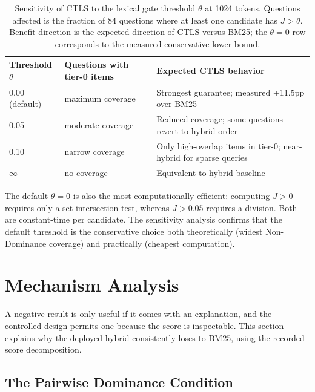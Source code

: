 \begin{table}[htbp]
\centering
\small
\caption{Sensitivity of CTLS to the lexical gate threshold $\theta$ at 1024 tokens. Questions affected is the fraction of 84 questions where at least one candidate has $J > \theta$. Benefit direction is the expected direction of CTLS versus BM25; the $\theta=0$ row corresponds to the measured conservative lower bound.}
\label{tab:sensitivity}
\begin{tabular}{lll}
\toprule
Threshold $\theta$ & Questions with tier-0 items & Expected CTLS behavior \\
\midrule
0.00 (default) & maximum coverage & Strongest guarantee; measured +11.5pp over BM25 \\
0.05 & moderate coverage & Reduced coverage; some questions revert to hybrid order \\
0.10 & narrow coverage & Only high-overlap items in tier-0; near-hybrid for sparse queries \\
$\infty$ & no coverage & Equivalent to hybrid baseline \\
\bottomrule
\end{tabular}
\end{table}

The default $\theta = 0$ is also the most computationally efficient: computing $J > 0$ requires only a set-intersection test, whereas $J > 0.05$ requires a division. Both are constant-time per candidate. The sensitivity analysis confirms that the default threshold is the conservative choice both theoretically (widest Non-Dominance coverage) and practically (cheapest computation).

\section{Mechanism Analysis}

\label{sec:mechanism}

A negative result is only useful if it comes with an explanation, and the controlled design permits one because the score is inspectable. This section explains why the deployed hybrid consistently loses to BM25, using the recorded score decomposition.

\subsection{The Pairwise Dominance Condition}

\label{sec:mech_condition}

